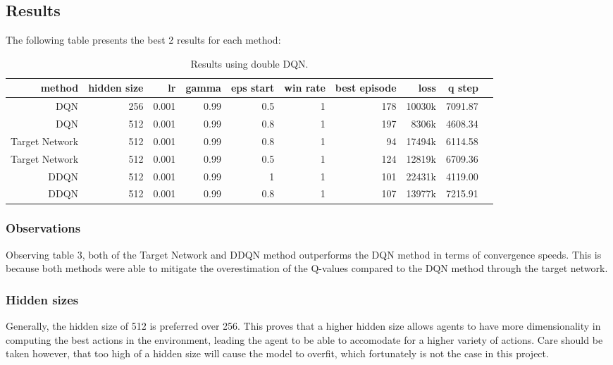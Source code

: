 \subsection{Results}

The following table presents the best 2 results for each method:

\begin{table}[h]
	\centering
	\scriptsize
	\begin{tabular}{r r r r | r r r r r r}
		\toprule
  method & hidden size & lr & gamma & eps start & win rate & best episode & loss & q step \\
  \midrule
  DQN & 256 & 0.001 & 0.99 & 0.5 & 1 & 178 & 10030k & 7091.87 \\
  DQN & 512 & 0.001 & 0.99 & 0.8 & 1 & 197 & 8306k & 4608.34 \\
  Target Network & 512 & 0.001 & 0.99 & 0.8 & 1 & 94 & 17494k & 6114.58 \\
  Target Network & 512 & 0.001 & 0.99 & 0.5 & 1 & 124 & 12819k & 6709.36 \\
  DDQN & 512 & 0.001 & 0.99 & 1 & 1 & 101 & 22431k & 4119.00 \\
  DDQN & 512 & 0.001 & 0.99 & 0.8 & 1 & 107 & 13977k & 7215.91 \\
  \bottomrule
  \end{tabular}
	\caption{Results using double DQN.}
	\label{best_results_t2}
\end{table}


\subsubsection{Observations}
Observing table 3, both of the Target Network and DDQN method outperforms the DQN method in terms of convergence speeds. This is because both methods were able to mitigate the overestimation of the Q-values compared to the DQN method through the target network.

\subsubsection{Hidden sizes}
Generally, the hidden size of 512 is preferred over 256. This proves that a higher hidden size allows agents to have more dimensionality in computing the best actions in the environment, leading the agent to be able to accomodate for a higher variety of actions. Care should be taken however, that too high of a hidden size will cause the model to overfit, which fortunately is not the case in this project.

